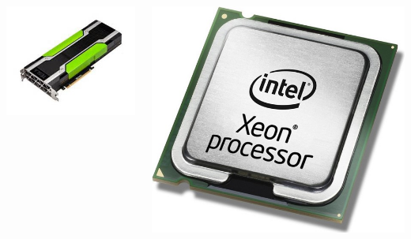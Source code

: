 \documentclass[20pt, a0paper, landscape, margin=0mm, innermargin=15mm, blockverticalspace=15mm, colspace=15mm, subcolspace=8mm]{tikzposter}
\begin{document}
\begin{columns}
{    \begin{minipage}{0.45\linewidth}
    \centering
    \begin{tikzfigure}
    \includegraphics[width=\linewidth]{BigGpu}
    \end{tikzfigure}
    \end{minipage}
    \hfill
    \begin{minipage}{0.45\linewidth}
    \centering
    \begin{tikzfigure}
    \includegraphics[width=\linewidth]{XEONCPU}
    \end{tikzfigure}
    \vspace{0.25em}
    \end{minipage}
    
}
\end{columns}
\end{document}
